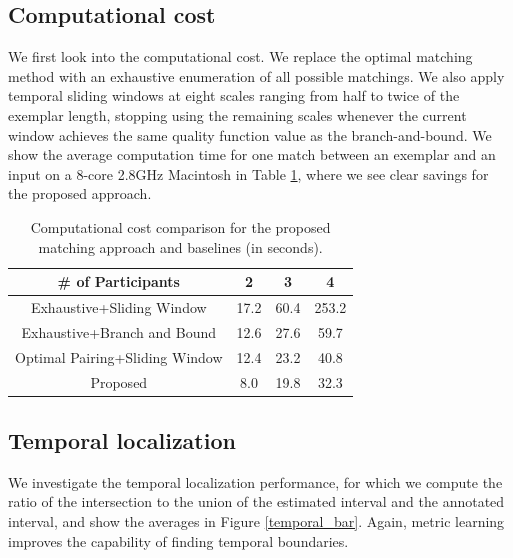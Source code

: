 \documentclass[10pt,twocolumn,letterpaper]{article}
\begin{document}
\subsection{Computational cost}

We first look into the computational cost. We replace the optimal matching method with an exhaustive enumeration of all possible matchings. We also apply temporal sliding windows at eight scales ranging from half to twice of the exemplar length, stopping using the remaining scales whenever the current window achieves the same quality function value as the branch-and-bound. We show the average computation time for one match between an exemplar and an input on a 8-core 2.8GHz Macintosh in Table \ref{computecost}, where we see clear savings for the proposed approach.


\begin{table}[h]
\centering \caption{Computational cost comparison for the proposed matching approach and baselines (in seconds).}
\footnotesize{
\begin{tabular}{|c|c|c|c|}
\hline    \# of Participants &  2  &  3  &  4   \\
\hline   Exhaustive+Sliding Window & 17.2   & 60.4   & 253.2   \\
\hline  Exhaustive+Branch and Bound &  12.6 &  27.6  &   59.7 \\
\hline  Optimal Pairing+Sliding Window & 12.4  & 23.2   &  40.8  \\
\hline  Proposed & 8.0  &  19.8  &  32.3  \\
\hline 
\end{tabular}
}
\label{computecost}
\end{table}

\subsection{Temporal localization}
We investigate the temporal localization performance, for which we compute the ratio of the intersection to the union of the estimated interval and the annotated interval, and show the averages in Figure \ref{temporal_bar}.  Again, metric learning improves the capability of finding temporal boundaries.
\end{document}
